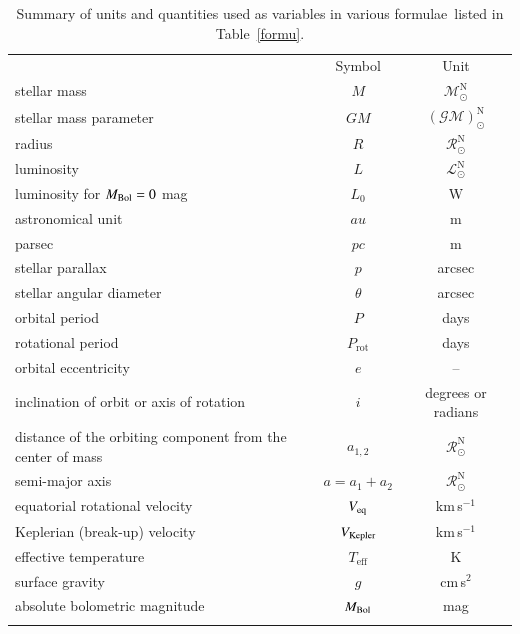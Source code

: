 \documentclass[preprint]{aastex}
\newcommand{\Rnom}{\hbox{$\mathcal{R}^{\mathrm N}_\odot$}}
\newcommand{\Lnom}{\hbox{$\mathcal{L}^{\mathrm N}_\odot$}}
\newcommand{\Mnom}{\hbox{$\mathcal{M}^{\mathrm N}_\odot$}}
\newcommand{\GMnom}{\hbox{$\mathcal{(GM)}^{\mathrm N}_\odot$}}
\newcommand{\rev}[1]{{#1}}
\begin{document}
\begin{table}
\begin{center}
\caption{Summary of units and quantities used as variables
in various formul\rev{ae}\ listed in Table~\ref{formu}.}
\label{units}
\begin{tabular}{l c c}
\noalign{\smallskip}\hline\hline\noalign{\smallskip}
\multicolumn{1}{c}{Quantity} & Symbol & Unit\\
\noalign{\smallskip}\hline\noalign{\smallskip}
stellar mass & $M$ & \Mnom\\
stellar mass parameter & $GM$ & \GMnom\\
radius & $R$ & \Rnom\\
luminosity & $L$ & \Lnom\\
luminosity for $M_{\rm Bol}=0$ mag &$L_0$&W\\
astronomical unit& $au$ & m\\
parsec&$pc$&m\\
stellar parallax &$p$& arcsec\\
stellar angular diameter&$\theta$& arcsec\\
orbital period & $P$ & days\\
rotational period& $P_\mathrm{rot}$& days\\
orbital eccentricity & $e$ & -- \\
inclination of orbit or axis of rotation& $i$ & degrees or radians \\
distance of the orbiting component from the center of mass&$a_{1,2}$&\Rnom\\
semi-major axis &$a = a_1+a_2$& \Rnom\\
equatorial rotational velocity& $V_{\rm eq}$ &km\,s$^{-1}$ \\
Keplerian (break-up) velocity&$V_{\rm Kepler}$&km\,s$^{-1}$ \\
effective temperature&$T_\mathrm{eff}$&K\\
surface gravity&$g$&cm\,s$^2$\\
\rev{absolute} bolometric magnitude&$M_{\rm Bol}$&mag\\
\noalign{\smallskip}\hline
\end{tabular}
\end{center}
\end{table}
\end{document}
